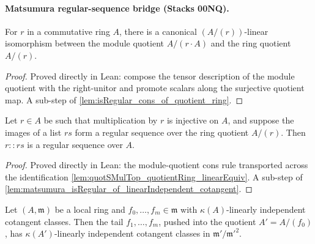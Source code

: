 \paragraph{Matsumura regular-sequence bridge (Stacks 00NQ).}

\begin{lemma}
  \label{lem:quotSMulTop_quotientRing_linearEquiv}
  For \(r\) in a commutative ring \(A\), there is a canonical \((A/(r))\)-linear
  isomorphism between the module quotient \(A/(r \cdot A)\) and the ring quotient
  \(A/(r)\).
\end{lemma}

\begin{proof}
  Proved directly in Lean: compose the tensor description of the module quotient with
  the right-unitor and promote scalars along the surjective quotient map. A sub-step of
  \cref{lem:isRegular_cons_of_quotient_ring}.
\end{proof}

\begin{lemma}
  \label{lem:isRegular_cons_of_quotient_ring}
  Let \(r \in A\) be such that multiplication by \(r\) is injective on \(A\), and
  suppose the images of a list \(rs\) form a regular sequence over the ring quotient
  \(A/(r)\). Then \(r :: rs\) is a regular sequence over \(A\).
\end{lemma}

\begin{proof}
  Proved directly in Lean: the module-quotient cons rule transported across the
  identification \cref{lem:quotSMulTop_quotientRing_linearEquiv}. A sub-step of
  \cref{lem:matsumura_isRegular_of_linearIndependent_cotangent}.
\end{proof}

\begin{lemma}
  \label{lem:matsumura_descent_cotangent}
  Let \((A, \mathfrak m)\) be a local ring and \(f_0,\dots,f_m \in \mathfrak m\) with
  \(\kappa(A)\)-linearly independent cotangent classes. Then the tail
  \(f_1,\dots,f_m\), pushed into the quotient \(A' = A/(f_0)\), has
  \(\kappa(A')\)-linearly independent cotangent classes in
  \(\mathfrak m'/\mathfrak m'^2\).
\end{lemma}

